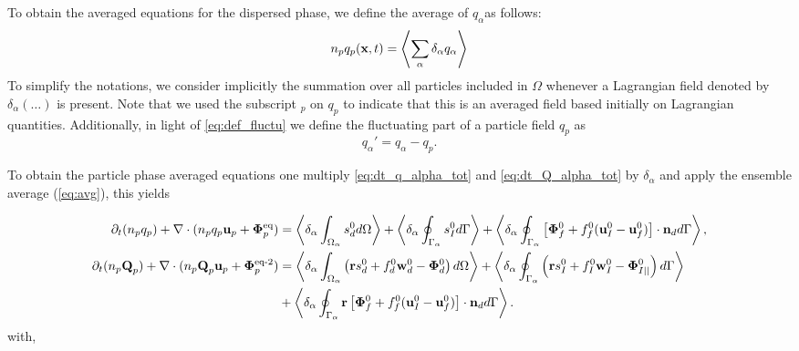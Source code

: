 To obtain the averaged equations for the dispersed phase, we define the average of $q_\alpha$​ as follows:
\begin{equation}
     n_p q_p(\textbf{x},t) = \left<\sum_\alpha\delta_\alpha q_\alpha\right>
     \label{eq:p_avg}
\end{equation}
To simplify the notations, we consider implicitly the summation over all particles included in $\Omega$ whenever a Lagrangian field denoted by $\delta_\alpha (\ldots)$ is present.
Note that we used the subscript $_p$ on $q_p$ to indicate that this is an averaged field based initially on Lagrangian quantities.  
Additionally, in light of \ref{eq:def_fluctu} we define the fluctuating part of a particle field $q_p$ as
\begin{equation}
    q_\alpha' = q_\alpha - q_p. 
    \label{eq:def_fluc_p}
\end{equation}

To obtain the particle phase averaged equations one multiply \ref{eq:dt_q_alpha_tot} and \ref{eq:dt_Q_alpha_tot} by $\delta_\alpha$ and apply the ensemble average (\ref{eq:avg}), this yields

\begin{align}
    \partial_t (n_pq_p)
    + \mathbf{\nabla}\cdot (n_p q_p \textbf{u}_p + \bm\Phi_p^\text{eq})
    &= \left<\delta_\alpha \int_{\Omega_{\alpha}}  s_d^0  d\Omega\right>
    + \left<\delta_\alpha \oint_{\Gamma_{\alpha}}  s_I^0  d\Gamma\right>
    + \left<\delta_\alpha \oint_{\Gamma_{\alpha}}  \left[\mathbf{\Phi}_f^0 + f_f^0 (\textbf{u}_I^0-\textbf{u}_f^0) \right] \cdot \textbf{n}_d  d\Gamma\right>,
    \label{eq:avg_dt_dq_alpha_tot}\\
    \partial_t (n_p\textbf{Q}_p)
    + \mathbf{\nabla}\cdot (n_p \textbf{Q}_p \textbf{u}_p + \bm\Phi_p^\text{eq-2})
    &=\left<\delta_\alpha \int_{\Omega_{\alpha}}  \left(
        \textbf{r} s_d^0         
        + f_d^0  \textbf{w}_d^0 
        - \mathbf{\Phi}_d^0
    \right)  d\Omega\right>
    + \left<\delta_\alpha \oint_{\Gamma_{\alpha}}  \left(
        \textbf{r}s_I^0
        + f_I^0 \textbf{w}_I^0
        - \mathbf{\Phi}_{I||}^0
    \right)  d\Gamma\right>\nonumber\\
    &+ \left<\delta_\alpha \oint_{\Gamma_{\alpha}}  \textbf{r} \left[
        \mathbf{\Phi}_f^0
        + f_f^0 (\textbf{u}_I^0-\textbf{u}_f^0)
    \right]\cdot \textbf{n}_d   d\Gamma\right>.
    \label{eq:avg_dt_dQ_alpha_tot}
\end{align}
with, 

